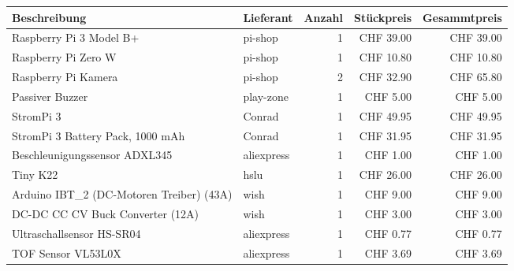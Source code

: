 \documentclass[../../main.tex]{subfiles}
\begin{document}
\begin{table}[H]
    \centering
    \begin{tabular}{|p{6cm}|l|r|r|r|}
    \hline
    \textbf{Beschreibung}                                   & \textbf{Lieferant} & \textbf{Anzahl} & \textbf{Stückpreis} & \textbf{Gesammtpreis} \\ \hline
    Raspberry Pi 3 Model B+                                 & pi-shop            & 1               & CHF 39.00           & CHF 39.00             \\ \hline
    Raspberry Pi Zero W                                     & pi-shop            & 1               & CHF 10.80           & CHF 10.80             \\ \hline
    Raspberry Pi Kamera                                     & pi-shop            & 2               & CHF 32.90           & CHF 65.80             \\ \hline
    Passiver Buzzer                                         & play-zone          & 1               & CHF 5.00            & CHF 5.00              \\ \hline
    StromPi 3                                               & Conrad             & 1               & CHF 49.95           & CHF 49.95             \\ \hline
    StromPi 3 Battery Pack, 1000 mAh                        & Conrad             & 1               & CHF 31.95           & CHF 31.95             \\ \hline
    Beschleunigungssensor ADXL345                           & aliexpress         & 1               & CHF 1.00            & CHF 1.00              \\ \hline
    Tiny K22                                                & hslu               & 1               & CHF 26.00           & CHF 26.00             \\ \hline
    Arduino IBT\_2 (DC-Motoren Treiber) (43A)               & wish               & 1               & CHF 9.00            & CHF 9.00              \\ \hline
    DC-DC CC CV Buck Converter (12A)                        & wish               & 1               & CHF 3.00            & CHF 3.00              \\ \hline
    Ultraschallsensor HS-SR04                               & aliexpress         & 1               & CHF 0.77            & CHF 0.77              \\ \hline
    TOF Sensor VL53L0X                                      & aliexpress         & 1               & CHF 3.69            & CHF 3.69              \\ \hline

\end{tabular}
\end{table}
\end{document}
